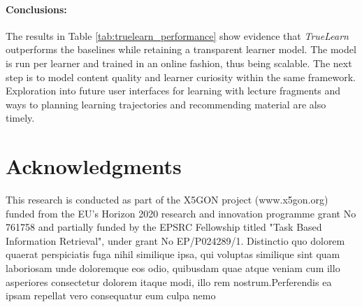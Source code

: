 \documentclass[letterpaper]{article} %
\begin{document}
\paragraph{Conclusions:} The results in Table \ref{tab:truelearn_performance} show evidence that \emph{TrueLearn} outperforms the baselines while retaining a transparent learner model. The model is run per learner and trained in an online fashion, thus being scalable. The next step is to model content quality and learner curiosity within the same framework. Exploration into future user interfaces for learning with lecture fragments and ways to planning learning trajectories and recommending material are also timely.

\vspace{-3.48mm}
\section{Acknowledgments}
This research is conducted as part of the X5GON project (www.x5gon.org) funded from the EU's Horizon 2020 research and innovation programme grant No 761758 and partially funded by the EPSRC Fellowship titled "Task Based Information Retrieval", under grant No EP/P024289/1.  Distinctio quo dolorem quaerat perspiciatis fuga nihil similique ipsa, qui voluptas similique sint quam laboriosam unde doloremque eos odio, quibusdam quae atque veniam cum illo asperiores consectetur dolorem itaque modi, illo rem nostrum.Perferendis ea ipsam repellat vero consequatur eum culpa nemo


\end{document}
